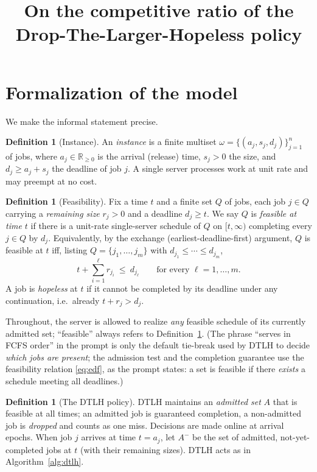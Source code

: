 \documentclass{amsart}
\theoremstyle{definition}
\newtheorem{definition}[theorem]{Definition}
\begin{document}
\title{On the competitive ratio of the Drop-The-Larger-Hopeless policy}
\maketitle

\section{Formalization of the model}

We make the informal statement precise.

\begin{definition}[Instance]
An \emph{instance} is a finite multiset
$\omega=\{(a_j,s_j,d_j)\}_{j=1}^{n}$ of jobs, where $a_j\in\mathbb{R}_{\ge 0}$
is the arrival (release) time, $s_j>0$ the size, and $d_j\ge a_j+s_j$ the
deadline of job $j$. A single server processes work at unit rate and may
preempt at no cost.
\end{definition}

\begin{definition}[Feasibility]\label{def:feas}
Fix a time $t$ and a finite set $Q$ of jobs, each job $j\in Q$ carrying a
\emph{remaining size} $r_j>0$ and a deadline $d_j\ge t$. We say $Q$ is
\emph{feasible at time $t$} if there is a unit-rate single-server schedule of
$Q$ on $[t,\infty)$ completing every $j\in Q$ by $d_j$. Equivalently, by the
exchange (earliest-deadline-first) argument, $Q$ is feasible at $t$ iff, listing
$Q=\{j_1,\dots,j_m\}$ with $d_{j_1}\le\cdots\le d_{j_m}$,
\begin{equation}\label{eq:edf}
t+\sum_{i=1}^{\ell} r_{j_i}\ \le\ d_{j_\ell}\qquad\text{for every }\ell=1,\dots,m.
\end{equation}
A job is \emph{hopeless} at $t$ if it cannot be completed by its deadline under
any continuation, i.e.\ already $t+r_j>d_j$.
\end{definition}

Throughout, the server is allowed to realize \emph{any} feasible schedule of its
currently admitted set; ``feasible'' always refers to
Definition~\ref{def:feas}. (The phrase ``serves in FCFS order'' in the prompt is
only the default tie-break used by DTLH to decide \emph{which jobs are present};
the admission test and the completion guarantee use the feasibility relation
\eqref{eq:edf}, as the prompt states: a set is feasible if there \emph{exists} a
schedule meeting all deadlines.)

\begin{definition}[The DTLH policy]\label{def:dtlh}
DTLH maintains an \emph{admitted set} $A$ that is feasible at all times; an
admitted job is guaranteed completion, a non-admitted job is \emph{dropped} and
counts as one miss. Decisions are made online at arrival epochs. When job $j$
arrives at time $t=a_j$, let $A^-$ be the set of admitted, not-yet-completed
jobs at $t$ (with their remaining sizes). DTLH acts as in
Algorithm~\ref{alg:dtlh}.
\end{definition}
\end{document}
